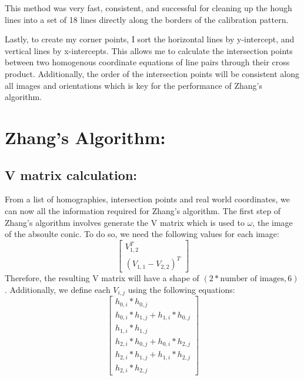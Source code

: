 \documentclass{article}
\begin{document}
This method was very fast, consistent, and successful for cleaning up the hough lines into a set of 18 lines directly along the borders of the calibration pattern.

Lastly, to create my corner points, I sort the horizontal lines by y-intercept, and vertical lines by x-intercepts. This allows me to calculate the intersection points between two homogenous coordinate equations of line pairs through their cross product. Additionally, the order of the intersection points will be consistent along all images and orientations which is key for the performance of Zhang's algorithm.


\section{Zhang's Algorithm:}
\subsection{V matrix calculation:}
From a list of homographies, intersection points and real world coordinates, we can now all the information required for Zhang's algorithm. The first step of Zhang's algorithm involves generate the V matrix which is used to $\omega$, the image of the absoulte conic. To do so, we need the following values for each image:
\[\begin{bmatrix}
    V_{1, 2}^T \\
    (V_{1, 1} - V_{2, 2})^T
\end{bmatrix}\]
Therefore, the resulting V matrix will have a shape of \(\left(2*\text{number of images}, 6\right)\). Additionally, we define each $V_{i, j}$ using the following equations:
\[\begin{bmatrix}
    h_{0, i} * h_{0, j} \\
    h_{0, i} * h_{1, j} + h_{1, i} * h_{0, j} \\
    h_{1, i} * h_{1, j} \\
    h_{2, i} * h_{0, j} + h_{0, i} * h_{2, j} \\
    h_{2, i} * h_{1, j} + h_{1, i} * h_{2, j} \\
    h_{2, i} * h_{2, j}
\end{bmatrix}\]
\end{document}
